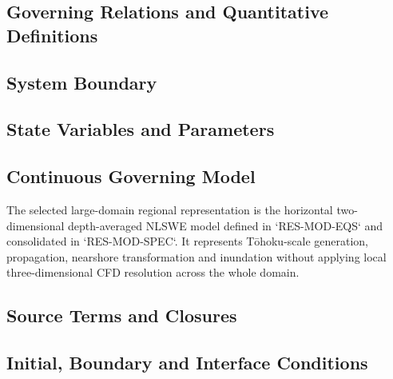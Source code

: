 \subsection{Governing Relations and Quantitative Definitions}
\label{sec:res-mod-lrg-governing-relations}

%

\subsection{System Boundary}
\label{sec:res-mod-lrg-system-boundary}


\subsection{State Variables and Parameters}
\label{sec:res-mod-lrg-state-variables-parameters}


\subsection{Continuous Governing Model}
\label{sec:res-mod-lrg-continuous-governing-model}

The selected large-domain regional representation is the horizontal
two-dimensional depth-averaged NLSWE model defined in
`RES-MOD-EQS` and consolidated in `RES-MOD-SPEC`. It represents
Tōhoku-scale generation, propagation, nearshore transformation and
inundation without applying local three-dimensional CFD resolution
across the whole domain.

\subsection{Source Terms and Closures}
\label{sec:res-mod-lrg-source-terms-closures}


\subsection{Initial, Boundary and Interface Conditions}
\label{sec:res-mod-lrg-initial-boundary-interface-conditions}

